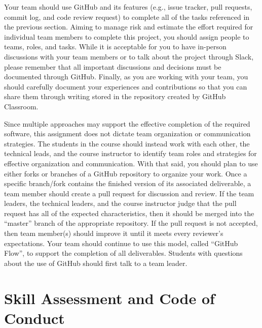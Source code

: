 \documentclass[11pt]{article}
\begin{document}
Your team should use GitHub and its features (e.g., issue tracker, pull
requests, commit log, and code review request) to complete all of the tasks
referenced in the previous section.
%
Aiming to manage risk and estimate the effort required for individual team
members to complete this project, you should assign people to teams, roles, and
tasks. While it is acceptable for you to have in-person discussions with your
team members or to talk about the project through Slack, please remember that
all important discussions and decisions must be documented through GitHub.
Finally, as you are working with your team, you should carefully document your
experiences and contributions so that you can share them through writing stored
in the repository created by GitHub Classroom.

Since multiple approaches may support the effective completion of the required
software, this assignment does not dictate team organization or communication
strategies. The students in the course should instead work with each other, the
technical leads, and the course instructor to identify team roles and strategies
for effective organization and communication. With that said, you should plan to
use either forks or branches of a GitHub repository to organize your work.
%
Once a specific branch/fork contains the finished version of its associated
deliverable, a team member should create a pull request for discussion and
review. If the team leaders, the technical leaders, and the course instructor
judge that the pull request has all of the expected characteristics, then it
should be merged into the ``master'' branch of the appropriate repository. If
the pull request is not accepted, then team member(s) should improve it until it
meets every reviewer's expectations. Your team should continue to use this
model, called ``GitHub Flow'', to support the completion of all deliverables.
%
Students with questions about the use of GitHub should first talk to a team
leader.

\section*{Skill Assessment and Code of Conduct}

\end{document}
